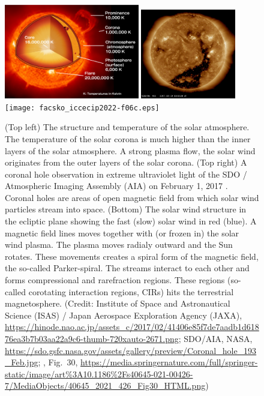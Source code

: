 \documentclass[sn-aps]{sn-jnl}%
\begin{document}
\begin{figure}[h]
\centering
\includegraphics[width=0.525\textwidth]{facsko_iccecip2022-f06a.eps}
\includegraphics[width=0.37\textwidth]{facsko_iccecip2022-f06b.eps}
\texttt{[image: facsko\_iccecip2022-f06c.eps]}
\caption{(Top left) The structure and temperature of the solar atmosphere. The temperature of the solar corona is much higher than the inner layers of the solar atmosphere. A strong plasma flow, the solar wind originates from the outer layers of the solar corona. (Top right) A coronal hole observation in extreme ultraviolet light of the SDO / Atmospheric Imaging Assembly (AIA) on February 1, 2017 \cite{pesnell12:_solar_dynam_obser_sdo,lemen12:_atmos_imagin_assem_aia_solar}.  Coronal holes are areas of open magnetic field from which solar wind particles stream into space. (Bottom) The solar wind structure in the ecliptic plane showing the fast (slow) solar wind in red (blue). A magnetic field lines moves together with (or frozen in) the solar wind plasma. The plasma moves radialy outward and the Sun rotates. These movements creates a spiral form of the magnetic field, the so-called Parker-spiral. The streams interact to each other and forms compressional and rarefraction regions. These regions (so-called corotating interaction regions, CIRs) hits the terrestrial magnetosphere. (Credit: Institute of Space and Astronautical Science (ISAS) / Japan Aerospace Exploration Agency (JAXA), \url{https://hinode.nao.ac.jp/assets_c/2017/02/41406e85f7de7aadb1d61876ea3b7b03aa22a9c6-thumb-720xauto-2671.png}; SDO/AIA, NASA, \url{https://sdo.gsfc.nasa.gov/assets/gallery/preview/Coronal_hole_193_Feb.jpg}; \cite{zhang21:_earth}, Fig.~30, \url{https://media.springernature.com/full/springer-static/image/art\%3A10.1186\%2Fs40645-021-00426-7/MediaObjects/40645\_2021\_426\_Fig30\_HTML.png})}\label{fig:corona}
\end{figure}
\end{document}
